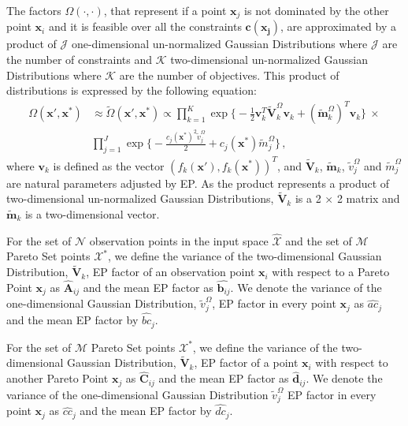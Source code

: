 \documentclass[review,preprint,12pt]{elsarticle}
\begin{document}
The factors $\Omega(\cdot,\cdot)$, that represent if a point $\boldsymbol{x}_j$ is not dominated by the other point $\boldsymbol{x}_i$ and it is feasible over all the constraints $\boldsymbol{\boldsymbol{c}(\boldsymbol{x}_j)}$, are approximated by a product of $\mathcal{J}$ one-dimensional un-normalized Gaussian Distributions where $\mathcal{J}$ are the number of constraints and $\mathcal{K}$ two-dimensional un-normalized Gaussian Distributions where $\mathcal{K}$ are the number of objectives. This product of distributions is expressed by the following equation:
\begin{align}
\Omega(\boldsymbol{x}',\boldsymbol{x}^*) & \approx \tilde{\Omega}(\boldsymbol{x}',\boldsymbol{x}^*) \propto \prod_{k=1}^{K}\exp\bigg\{-\frac{1}{2}\boldsymbol{v}_{k}^{T}\tilde{\boldsymbol{V}}_{k}^{\Omega}\boldsymbol{v}_k + (\tilde{\boldsymbol{m}}_{k}^{\Omega})^{T}\boldsymbol{v}_k\bigg\} \  \times \nonumber \\ & \prod_{j=1}^{J} \exp \bigg\{ - \frac{c_j(\boldsymbol{x}^*)^2\tilde{v}_j^{\Omega}}{2} + c_j(\boldsymbol{x}^*)\tilde{m}_j^{\Omega} \bigg\}\,,
\end{align}
where $\boldsymbol{v}_k$ is defined as the vector $(f_k(\boldsymbol{x}'),f_k(\boldsymbol{x}^*))^T$, and $\tilde{\boldsymbol{V}}_{k}$, $\tilde{\boldsymbol{m}}_{k}$, $\tilde{v}_j^{\Omega}$ and $\tilde{m}_j^{\Omega}$ are natural parameters adjusted by EP. As the product represents a product of two-dimensional un-normalized Gaussian Distributions, $\tilde{\boldsymbol{V}}_{k}$ is a 2 $\times$ 2 matrix and $\tilde{\boldsymbol{m}}_{k}$ is a two-dimensional vector.

For the set of $\mathcal{N}$ observation points in the input space $\hat{\mathcal{X}}$ and the set of $\mathcal{M}$ Pareto Set points $\mathcal{X}^*$, we define the variance of the two-dimensional Gaussian Distribution, $\tilde{\boldsymbol{V}}_{k}$, EP factor of an observation point $\boldsymbol{x}_i$ with respect to a Pareto Point $\boldsymbol{x}_j$ as $\hat{\boldsymbol{A}}_{ij}$ and the mean EP factor as $\hat{\boldsymbol{b}_{ij}}$. We denote the variance of the one-dimensional Gaussian Distribution, $\tilde{v}_j^{\Omega}$, EP factor in every point $\boldsymbol{x}_j$ as $\hat{ac}_j$ and the mean EP factor by $\hat{bc}_j$.

For the set of $\mathcal{M}$ Pareto Set points $\mathcal{X}^*$, we define the variance of the two-dimensional Gaussian Distribution, $\tilde{\boldsymbol{V}}_{k}$, EP factor of a point $\boldsymbol{x}_i$ with respect to another Pareto Point $\boldsymbol{x}_j$ as $\hat{\boldsymbol{C}}_{ij}$ and the mean EP factor as $\hat{\boldsymbol{d}}_{ij}$. We denote the variance of the one-dimensional Gaussian Distribution $\tilde{v}_j^{\Omega}$ EP factor in every point $\boldsymbol{x}_j$ as $\hat{cc}_j$ and the mean EP factor by $\hat{dc}_j$.
\end{document}
